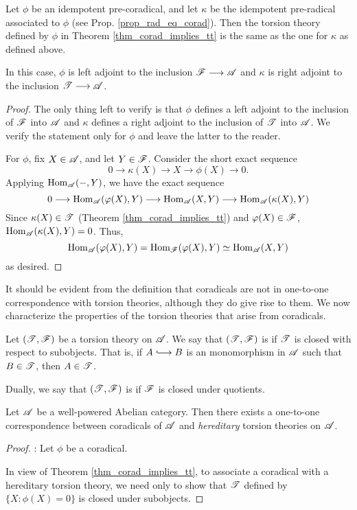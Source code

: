 \begin{cor}
Let $\phi$ be an idempotent pre-coradical, and let $\kappa$ be the 
idempotent pre-radical associated to $\phi$ (see Prop. 
\ref{prop_rad_eq_corad}). Then the torsion theory defined by $\phi$
in Theorem \ref{thm_corad_implies_tt} is the same as the one for
$\kappa$ as defined above.

In this case, $\phi$ is left adjoint to the inclusion $\mathscr{F} \longrightarrow 
\mathscr{A}$ and $\kappa$ is right adjoint to the inclusion $\mathscr{T} 
\longrightarrow \mathscr{A}$.
\end{cor}
\begin{proof}
The only thing left to verify is that $\phi$ defines a left 
adjoint to the inclusion of $\mathscr{F}$ into $\mathscr{A}$ and $\kappa$ 
defines a right adjoint to the inclusion of $\mathscr{T}$ into 
$\mathscr{A}$. We verify the statement only for $\phi$ and leave the 
latter to the reader.  

For $\phi$, fix $X \in \mathscr{A}$, and let $Y \in \mathscr{F}$. 
Consider the short exact sequence
\[
0 \to \kappa(X) \to X \to \phi(X) \to 0.
\]
Applying $\mathrm{Hom}_{\mathscr{A}}(-, Y)$, we have the exact sequence
\[
0 \longrightarrow \mathrm{Hom}_{\mathscr{A}}(\varphi(X), Y) \longrightarrow \mathrm{Hom}_{\mathscr{A}}(X, Y) \longrightarrow
\mathrm{Hom}_{\mathscr{A}}(\kappa(X), Y)
\]
Since $\kappa(X) \in \mathscr{T}$ (Theorem 
\ref{thm_corad_implies_tt}) and $\varphi(X) \in \mathscr{F}$, 
$\mathrm{Hom}_{\mathscr{A}}(\kappa(X), Y) = 0$. Thus,
\[
\mathrm{Hom}_{\mathscr{A}}(\varphi(X), Y) = \mathrm{Hom}_{\mathscr{F}}(\varphi(X), Y) \simeq 
   \mathrm{Hom}_{\mathscr{A}}(X, Y)
\]
as desired.
\end{proof}

It should be evident from the definition that coradicals are not
in one-to-one correspondence with torsion theories, although they
do give rise to them. We now characterize the properties of the 
torsion theories that arise from coradicals.

\begin{defn}
Let $(\mathscr{T}, \mathscr{F})$ be a torsion theory on $\mathscr{A}$. We say 
that $(\mathscr{T}, \mathscr{F})$ is  if $\mathscr{T}$ is 
closed with respect to subobjects. That is, if $A \into B$ is an 
monomorphism in $\mathscr{A}$ such that $B \in \mathscr{T}$, then $A \in 
\mathscr{T}$.

Dually, we say that $(\mathscr{T}, \mathscr{F})$ is  if
$\mathscr{F}$ is closed under quotients.
\end{defn}

\begin{thm}\label{thm_corad_equiv_htt}
Let $\mathscr{A}$ be a well-powered Abelian category. Then there 
exists a one-to-one correspondence between coradicals of $\mathscr{A}$ 
and \emph{hereditary} torsion theories on $\mathscr{A}$.
\end{thm}
\begin{proof}

 : Let 
$\phi$ be a coradical.

In view of Theorem \ref{thm_corad_implies_tt}, to associate a 
coradical with a hereditary torsion theory, we need only to show
that $\mathscr{T}$ defined by $\{X : \phi(X) = 0\}$ is closed under
subobjects.
\end{proof}
